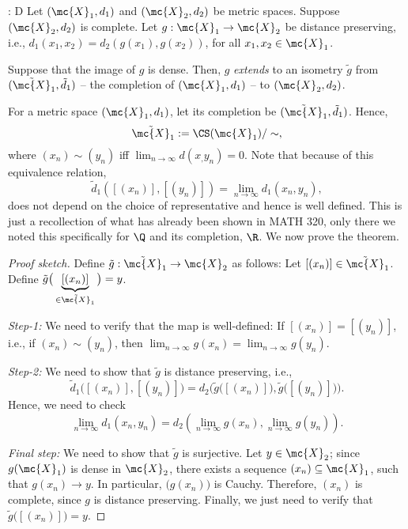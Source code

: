 \begin{ntheorem}{: D}
    Let \((\mc{X}_1,d_1)\) and \((\mc{X}_2,d_2)\) be metric spaces. Suppose \((\mc{X}_2,d_2)\) is complete. Let \(g:\mc{X}_1\to\mc{X}_2\) be distance preserving, i.e., \(d_1(x_1,x_2)=d_2(g(x_1),g(x_2))\), for all \(x_1,x_2\in\mc{X}_1\).

    \medskip

    Suppose that the image of \(g\) is dense. Then, \(g\) \emph{extends} to an isometry \(\tilde{g}\) from \((\tilde{\mc{X}}_1,\tilde{d}_1)\) -- the completion of \((\mc{X}_1,d_1)\) -- to \((\mc{X}_2,d_2)\).
\end{ntheorem}
For a metric space \((\mc{X}_1,d_1)\), let its completion be \((\tilde{\mc{X}}_1,\tilde{d}_1)\). Hence, 
\begin{equation*} 
    \tilde{\mc{X}}_1:=\CS(\mc{X}_1)/\sim,
\end{equation*}
where \((x_n)\sim(y_n)\) iff \(\displaystyle\lim_{n\to\infty}d(x_,y_n)=0\). Note that because of this equivalence relation,
\begin{equation*} 
    \tilde{d}_1([(x_n)],[(y_n)])=\lim_{n\to\infty}d_1(x_n,y_n),
\end{equation*}
does not depend on the choice of representative and hence is well defined. This is just a recollection of what has already been shown in MATH 320, only there we noted this specifically for \(\Q\) and its completion, \(\R\). We now prove the theorem.
\begin{proof}[Proof sketch]
    Define \(\tilde{g}:\tilde{\mc{X}}_1\to\mc{X}_2\) as follows: Let \([(x_n)]\in\tilde{\mc{X}}_1\). Define \(\displaystyle\tilde{g}\big(\underbrace{[(x_n)]}_{\in\tilde{\mc{X}}_1}\big)=y\). 

    \medskip
    
    \emph{Step-1:} We need to verify that the map is well-defined: If \([(x_n)]=[(y_n)]\), i.e., if \((x_n)\sim (y_n)\), then \(\displaystyle\lim_{n\to\infty} g(x_n)=\lim_{n\to\infty} g(y_n)\).

    \medskip

    \emph{Step-2:} We need to show that \(\tilde{g}\) is distance preserving, i.e., 
    \begin{equation*} 
        \tilde{d}_1\big([(x_n)],[(y_n)]\big)=d_2\bigg(\tilde{g}\big([(x_n)]\big),\tilde{g}\big([(y_n)]\big)\bigg).
    \end{equation*}
    Hence, we need to check 
    \begin{equation*} 
        \lim_{n\to\infty}d_1(x_n,y_n)=d_2(\lim_{n\to\infty}g(x_n),\lim_{n\to\infty}g(y_n)).
    \end{equation*}

    \medskip

    \emph{Final step:} We need to show that \(\tilde{g}\) is surjective. Let \(y\in\mc{X}_2\); since \(g(\mc{X}_1)\) is dense in \(\mc{X}_2\), there exists a sequence \((x_n)\subseteq\mc{X}_1\), such that \(g(x_n)\to y\). In particular, \(\displaystyle\big(g(x_n)\big)\) is Cauchy. Therefore, \((x_n)\) is complete, since \(g\) is distance preserving. Finally, we just need to verify that \(\displaystyle\tilde{g}\big([(x_n)]\big)=y\).
\end{proof}
